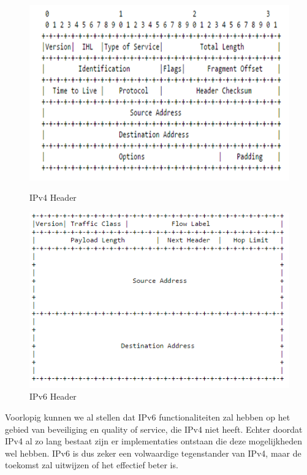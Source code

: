 \documentclass[pdftex,a4paper,12pt,twoside]{report}
\begin{document}
\begin{figure}[H]
\centering
\begin{minipage}{.45\linewidth}
  \includegraphics[width=\linewidth]{img/IPv4}
  \caption{IPv4 Header}
  \label{img1}
\end{minipage}
\hspace{.05\linewidth}
\begin{minipage}{.45\linewidth}
  \includegraphics[width=\linewidth]{img/IPv6}
  \caption{IPv6 Header}
  \label{img2}
\end{minipage}
\end{figure}
\newpage
Voorlopig kunnen we al stellen dat IPv6 functionaliteiten zal hebben op het gebied van beveiliging en quality of service, die IPv4 niet heeft. Echter doordat IPv4 al zo lang bestaat zijn er implementaties ontstaan die deze mogelijkheden wel hebben. IPv6 is dus zeker een volwaardige tegenstander van IPv4, maar de toekomst zal uitwijzen of het effectief beter is. 
\end{document}

